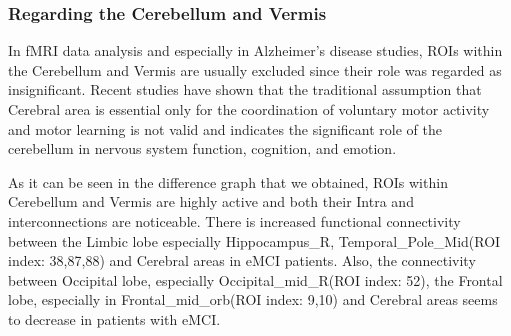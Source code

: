 \documentclass[preprint,12pt]{elsarticle}
\begin{document}
	\subsubsection*{\textbf{Regarding the Cerebellum and Vermis}}
	In fMRI data analysis and especially in Alzheimer's disease studies, ROIs within the Cerebellum and Vermis are usually excluded since their role was regarded as insignificant\cite{r47, r48}. Recent studies have shown that the traditional assumption that Cerebral area is essential only for the coordination of voluntary motor activity and motor learning is not valid and indicates the significant role of the cerebellum in nervous system function, cognition, and emotion\cite{r32}. 
	
	As it can be seen in the difference graph that we obtained, ROIs within Cerebellum and Vermis are highly active and both their Intra and interconnections are noticeable. There is increased functional connectivity between the Limbic lobe especially 
	Hippocampus\_R, Temporal\_Pole\_Mid(ROI index: 38,87,88)
	and Cerebral areas in eMCI patients. Also, the connectivity between Occipital lobe, especially Occipital\_mid\_R(ROI index: 52), the Frontal lobe, especially in Frontal\_mid\_orb(ROI index: 9,10) and Cerebral areas seems to decrease in patients with eMCI. 
	
	
	
\end{document}

